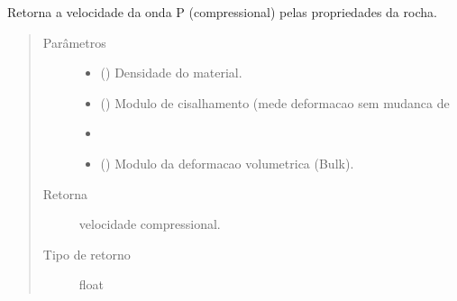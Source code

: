 \documentclass[letterpaper,10pt,brazil]{sphinxmanual}
\begin{document}
\begin{fulllineitems}
\label{\detokenize{source/base:base.velocity_p_by_shear}}
Retorna a velocidade da onda P (compressional) pelas propriedades da
rocha.
\begin{quote}\begin{description}
\item[{Parâmetros}] \leavevmode\begin{itemize}
\item {} 
 () \textendash{} Densidade do material.

\item {} 
 () \textendash{} Modulo de cisalhamento (mede deformacao sem mudanca de

\item {} 
\sphinxstyleliteralstrong{)}\sphinxstyleliteralstrong{} \textendash{} 

\item {} 
 () \textendash{} Modulo da deformacao volumetrica (Bulk).

\end{itemize}

\item[{Retorna}] \leavevmode
velocidade compressional.

\item[{Tipo de retorno}] \leavevmode
float

\end{description}\end{quote}

\end{fulllineitems}

\end{document}
